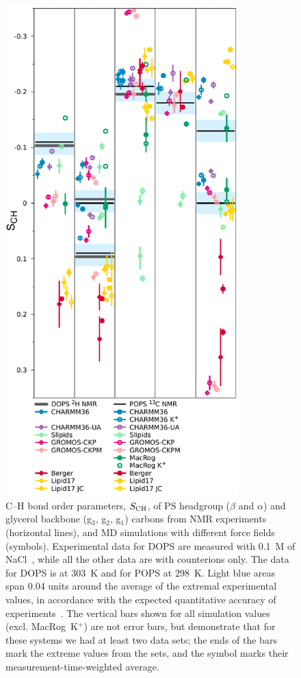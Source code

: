 \documentclass[journal=jpcbfk,manuscript=article]{achemso}
\begin{document}
\begin{figure}[]
  \centering
  \includegraphics[width=9.0cm]{../Figs/HGorderparametersPS.pdf}
  \caption{\label{HGorderParametersPS}
    C--H bond order parameters, $S_{\rm CH}$, of PS headgroup ($\beta$ and $\alpha$) and
    glycerol backbone (g$_3$, g$_2$, g$_1$) carbons from NMR experiments (horizontal lines),
    and MD simulations with different force fields (symbols).
    Experimental data for DOPS are measured with 0.1~M of NaCl~\cite{browning80},
    while all the other data are with counterions only.
    The data for DOPS is at 303~K and for POPS at 298~K.
    Light blue areas span 0.04 units around the average of the extremal experimental values,
    in accordance with the expected quantitative accuracy of experiments~\cite{ollila16}.
    The vertical bars shown for all simulation values (excl. MacRog~K$^+$)
    are not error bars, but demonstrate that for these systems
    we had at least two data sets; the ends of the bars mark the extreme values
    from the sets, and the symbol marks their measurement-time-weighted average.
  }
\end{figure}
\end{document}
